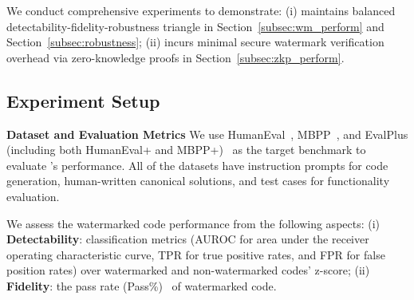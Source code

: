 
 

We conduct comprehensive experiments to demonstrate: (i) \sys{} maintains balanced detectability-fidelity-robustness triangle in Section~\ref{subsec:wm_perform} and Section~\ref{subsec:robustness}; (ii) \sys{} incurs minimal secure watermark verification overhead via zero-knowledge proofs in Section~\ref{subsec:zkp_perform}.  


\subsection{Experiment Setup}

\textbf{Dataset and Evaluation Metrics} We use HumanEval~\cite{chen2021evaluating}, MBPP~\cite{austin2021program}, and EvalPlus (including both HumanEval+ and MBPP+)~\cite{evalplus} as the target benchmark to evaluate \sys's performance. All of the datasets have instruction prompts for code generation, human-written canonical solutions, and test cases for functionality evaluation. 


We assess the watermarked code performance from the following aspects: (i) \textbf{Detectability}: classification metrics (AUROC for area under the receiver operating characteristic curve, TPR for true positive rates, and FPR for false position rates) over watermarked and non-watermarked codes' z-score; (ii) \textbf{Fidelity}: the pass rate (Pass\%)~\cite{chen2021evaluating} of watermarked code. 


